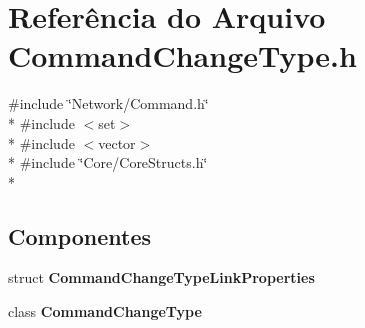 \section{Referência do Arquivo Command\+Change\+Type.\+h}
\label{_command_change_type_8h}
{\ttfamily \#include \char`\"{}Network/\+Command.\+h\char`\"{}}\\*
{\ttfamily \#include $<$set$>$}\\*
{\ttfamily \#include $<$vector$>$}\\*
{\ttfamily \#include \char`\"{}Core/\+Core\+Structs.\+h\char`\"{}}\\*
\subsection*{Componentes}
\begin{DoxyCompactItemize}
\item 
struct {\bf Command\+Change\+Type\+Link\+Properties}
\item 
class {\bf Command\+Change\+Type}
\end{DoxyCompactItemize}
